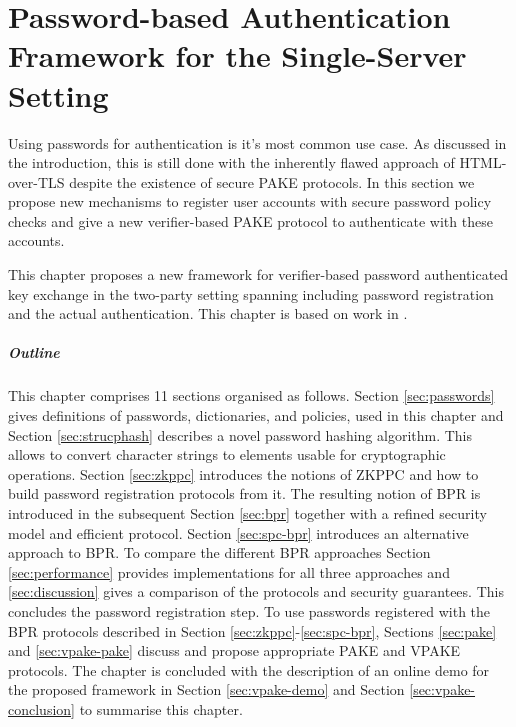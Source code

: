 \chapter[Password Authentication Framework for the Single-Server Setting]{Password-based Authentication Framework for the Single-Server Setting} \label{ch:vpake}
Using passwords for authentication is it's most common use case.
As discussed in the introduction, this is still done with the inherently flawed approach of \ac{HTML}-over-\ac{TLS} despite the existence of secure \ac{PAKE} protocols.
In this section we propose new mechanisms to register user accounts with secure password policy checks and give a new verifier-based \ac{PAKE} protocol to authenticate with these accounts.

This chapter proposes a new framework for verifier-based password authenticated key exchange in the two-party setting spanning including password registration and the actual authentication.
This chapter is based on work in \cite{Kiefer13a,Kiefer2012,KieferM14b,KieferM15a,DongK15a,ManulisSKD15a}.

\paragraph{Outline}
This chapter comprises 11 sections organised as follows.
Section \ref{sec:passwords} gives definitions of passwords, dictionaries, and policies, used in this chapter and Section \ref{sec:strucphash} describes a novel password hashing algorithm.
This allows to convert character strings to elements usable for cryptographic operations.
Section \ref{sec:zkppc} introduces the notions of \ac{ZKPPC} and how to build password registration protocols from it.
The resulting notion of \ac{BPR} is introduced in the subsequent Section \ref{sec:bpr} together with a refined security model and efficient protocol.
Section \ref{sec:spc-bpr} introduces an alternative approach to \ac{BPR}.
To compare the different \ac{BPR} approaches Section \ref{sec:performance} provides implementations for all three approaches and \ref{sec:discussion} gives a comparison of the protocols and security guarantees.
This concludes the password registration step.
To use passwords registered with the \ac{BPR} protocols described in Section \ref{sec:zkppc}-\ref{sec:spc-bpr}, Sections \ref{sec:pake} and \ref{sec:vpake-pake} discuss and propose appropriate \ac{PAKE} and \ac{VPAKE} protocols.
The chapter is concluded with the description of an online demo for the proposed framework in Section \ref{sec:vpake-demo} and Section \ref{sec:vpake-conclusion} to summarise this chapter.


